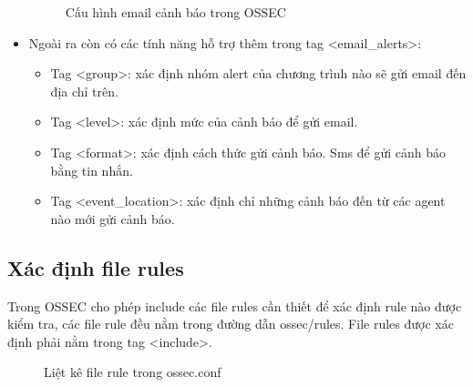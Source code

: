 \begin{itemize}
\begin{figure}[h!]
	\caption{Cấu hình email cảnh báo trong OSSEC}
  \end{figure}
  \item Ngoài ra còn có các tính năng hỗ trợ thêm trong tag
  \textless email\_alerts\textgreater:
  \begin{itemize}
    \item Tag \textless group\textgreater: xác định nhóm alert của chương trình
    nào sẽ gửi email đến địa chỉ trên.
    \item Tag \textless level\textgreater: xác định mức của cảnh báo để gửi
    email.
    \item Tag \textless format\textgreater: xác định cách thức gửi cảnh báo. Sms
    để gửi cảnh báo bằng tin nhắn.
    \item Tag \textless event\_location\textgreater: xác định chỉ những cảnh báo
    đến từ các agent nào mới gửi cảnh báo.
    \end{itemize}
  \end{itemize}
  \subsection{Xác định file rules}
  Trong OSSEC cho phép include các file rules cần thiết để xác định rule nào
  được kiểm tra, các file rule đều nằm trong đường dẫn ossec/rules. File rules
  được xác định phải nằm trong tag \textless include\textgreater.
  \begin{figure}[h!]
	\centering 
{}
	\caption{Liệt kê file rule trong ossec.conf}
  \end{figure}
